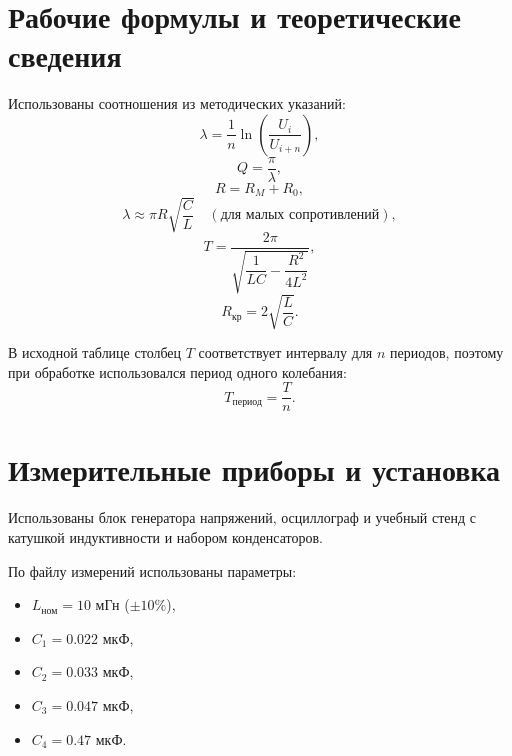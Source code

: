 \documentclass[a4paper,14pt]{article}
\begin{document}
\section{Рабочие формулы и теоретические сведения}

Использованы соотношения из методических указаний:
\begin{equation}
\lambda = \frac{1}{n}\ln\left(\frac{U_i}{U_{i+n}}\right),
\end{equation}
\begin{equation}
Q = \frac{\pi}{\lambda},
\end{equation}
\begin{equation}
R = R_M + R_0,
\end{equation}
\begin{equation}
\lambda \approx \pi R\sqrt{\frac{C}{L}}\quad (\text{для малых сопротивлений}),
\end{equation}
\begin{equation}
T = \frac{2\pi}{\sqrt{\dfrac{1}{LC}-\dfrac{R^2}{4L^2}}},
\end{equation}
\begin{equation}
R_{\text{кр}} = 2\sqrt{\frac{L}{C}}.
\end{equation}

В исходной таблице столбец $T$ соответствует интервалу для $n$ периодов, поэтому при обработке использовался период одного колебания:
\begin{equation}
T_{\text{период}} = \frac{T}{n}.
\end{equation}


\section{Измерительные приборы и установка}

Использованы блок генератора напряжений, осциллограф и учебный стенд с катушкой индуктивности и набором конденсаторов.

По файлу измерений использованы параметры:
\begin{itemize}
    \item $L_{\text{ном}} = 10$ мГн ($\pm 10\%$),
    \item $C_1 = 0.022$ мкФ,
    \item $C_2 = 0.033$ мкФ,
    \item $C_3 = 0.047$ мкФ,
    \item $C_4 = 0.47$ мкФ.
\end{itemize}
\end{document}
